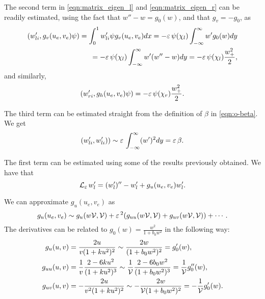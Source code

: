 The second term in \eqref{eqn:matrix_eigen_l} and \eqref{eqn:matrix_eigen_r} can be readily estimated, using the fact that $w''-w = g_0(w)$, and that $g_v=-g_0$, as
% 
\begin{equation*}
\begin{split}
\begin{aligned}
  (w'_{li},g_v(u_e,v_e)\psi) = \int_0^1 w_{li}'\psi g_v(u_e,v_e)dx  =-\varepsilon\,\psi(\chi_l)\int_{-\infty}^{\infty}w'g_0(w)dy  \\
  =-\varepsilon\,\psi(\chi_l)\int_{-\infty}^{\infty}w'(w''-w)dy = -\varepsilon\,\psi(\chi_l)\frac{w_+^2}{2},
\end{aligned}
\end{split}
\end{equation*}
% 
and similarly, 
% 
\begin{equation*}
\begin{split}
\begin{aligned}
  (w'_{ri},g_h(u_e,v_e)\psi) = -\varepsilon\,\psi(\chi_r)\frac{w_+^2}{2}.
\end{aligned}
\end{split}
\end{equation*}
% 

The third term can be estimated straight from the definition of $\beta$ in \eqref{eqn:o-beta}. We get
% 
\begin{equation*}
\begin{split}
\begin{aligned}
  (w'_{li},w'_{li})) \sim \varepsilon\,\int_{-\infty}^{\infty}(w')^2dy = \varepsilon\,\beta.
\end{aligned}
\end{split}
\end{equation*}
% 

The first term can be estimated using some of the results previously obtained. We have that 
% 
\begin{equation*}
  \mathcal{L}_{\varepsilon\,}w_l'=(w_l')''-w_l'+g_u(u_e,v_e)w_l'.
\end{equation*}
%

We can approximate $g_u(u_e,v_e)$ as 
% 
\begin{equation*}
g_u(u_e,v_e)\sim g_u(w\mathcal{V},\mathcal{V}) + \varepsilon\,^2(g_{uu}(w\mathcal{V},\mathcal{V}) + g_{uv}(w\mathcal{V},\mathcal{V}))+\cdots.
\end{equation*}
% 
The derivatives can be related to $g_0(w) = \frac{w^2}{1+b_0w^2}$ in the following way:
% 
\begin{equation*}
\begin{split}
\begin{aligned}
  g_u(u,v)&=\frac{2u}{v(1+ku^2)^2}\sim\frac{2w}{(1+b_0w^2)^2}=g_0'(w),\\
  g_{uu}(u,v)&=\frac{1}{v}\frac{2-6ku^2}{(1+ku^2)^3}\sim\frac{1}{\mathcal{V}}\frac{2-6b_0w^2}{(1+b_0w^2)^3}=\frac{1}{\mathcal{V}}g_0''(w),\\
  g_{uv}(u,v)&=-\frac{2u}{v^2(1+ku^2)^2}\sim-\frac{2w}{\mathcal{V}(1+b_0w^2)^2}=-\frac{1}{\mathcal{V}}g_0'(w).
\end{aligned}
\end{split}
\end{equation*}
% 

